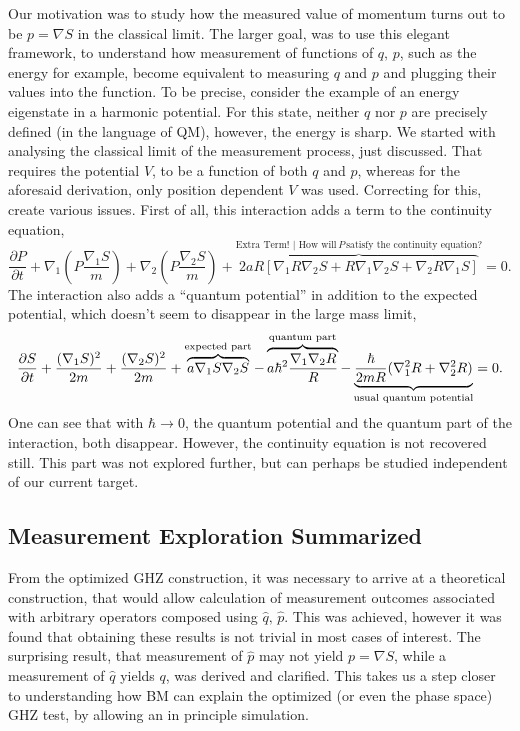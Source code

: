 Our motivation was to study how the measured value of momentum turns
out to be $p=\nabla S$ in the classical limit. The larger goal, was
to use this elegant framework, to understand how measurement of functions
of $q,\,p$, such as the energy for example, become equivalent to
measuring $q$ and $p$ and plugging their values into the function.
To be precise, consider the example of an energy eigenstate in a harmonic
potential. For this state, neither $q$ nor $p$ are precisely defined
(in the language of QM), however, the energy is sharp. We started
with analysing the classical limit of the measurement process, just
discussed. That requires the potential $V$, to be a function of both
$q$ and $p$, whereas for the aforesaid derivation, only position
dependent $V$ was used. Correcting for this, create various issues.
First of all, this interaction adds a term to the continuity equation,
\[
\frac{\partial P}{\partial t}+\nabla_{1}\left(P\frac{\nabla_{1}S}{m}\right)+\nabla_{2}\left(P\frac{\nabla_{2}S}{m}\right)+\overbrace{2aR\left[\nabla_{1}R\nabla_{2}S+R\nabla_{1}\nabla_{2}S+\nabla_{2}R\nabla_{1}S\right]}^{\text{Extra Term! | How will}\,P\,\text{satisfy the continuity equation?}}=0.
\]
The interaction also adds a ``quantum potential'' in addition to the
expected potential, which doesn't seem to disappear in the large mass
limit, 
\[
\frac{\partial S}{\partial t}+\frac{(\nabla_{1}S)^{2}}{2m}+\frac{(\nabla_{2}S)^{2}}{2m}+\overbrace{a\nabla_{1}S\nabla_{2}S}^{\text{expected part}}-\overbrace{a\hbar^{2}\frac{\nabla_{1}\nabla_{2}R}{R}}^{\text{\text{quantum part}}}-\underbrace{\frac{\hbar}{2mR}(\nabla_{1}^{2}R+\nabla_{2}^{2}R)}_{\text{usual quantum potential}}=0.
\]
One can see that with $\hbar\to0$, the quantum potential and the
quantum part of the interaction, both disappear. However, the continuity
equation is not recovered still. This part was not explored further,
but can perhaps be studied independent of our current target.


\subsection{Measurement Exploration Summarized}

From the optimized GHZ construction, it was necessary to arrive at
a theoretical construction, that would allow calculation of measurement
outcomes associated with arbitrary operators composed using $\hat{q},\,\hat{p}$.
This was achieved, however it was found that obtaining these results
is not trivial in most cases of interest. The surprising result, that
measurement of $\hat{p}$ may not yield $p=\nabla S$, while a measurement
of $\hat{q}$ yields $q$, was derived and clarified. This takes us
a step closer to understanding how BM can explain the optimized (or
even the phase space) GHZ test, by allowing an in principle simulation.


